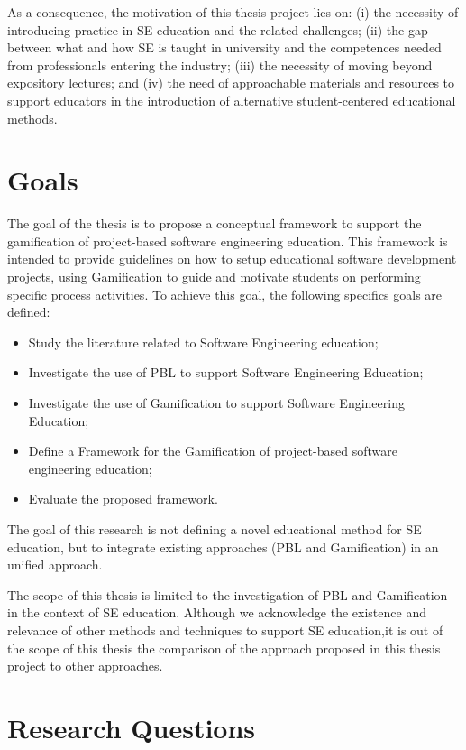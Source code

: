 As a consequence, the motivation of this thesis project lies on: (i) the necessity of introducing practice in SE education and the related challenges; (ii) the gap between what and how SE is taught in university and the competences needed from professionals entering the industry; (iii) the necessity of moving beyond expository lectures; and (iv) the need of approachable materials and resources to support educators in the introduction of alternative student-centered educational methods. 

\section{Goals}
\label{sec:goals}

The goal of the thesis is to propose a conceptual framework to support the gamification of project-based software engineering education. This framework is intended to provide guidelines on how to setup educational software development projects, using Gamification to guide and motivate students on performing specific process activities. To achieve this goal, the following specifics goals are defined:

\begin{itemize}
    \item Study the literature related to Software Engineering education;
    \item Investigate the use of PBL to support Software Engineering Education;
    \item Investigate the use of Gamification to support Software Engineering Education;
    \item Define a Framework for the Gamification of project-based software engineering education;
    \item Evaluate the proposed framework.
\end{itemize}

The goal of this research is not defining a novel educational method for SE education, but to integrate existing approaches (PBL and Gamification) in an unified approach.

The scope of this thesis is limited to the investigation of PBL and Gamification in the context of SE education. Although we acknowledge the existence and relevance of other methods and techniques to support SE education,it is out of the scope of this thesis the comparison of the approach proposed in this thesis project to other approaches.

\section{Research Questions}
\label{sec:questions}

